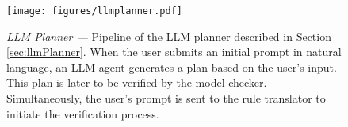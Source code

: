 


\begin{figure}[!h]
  \texttt{[image: figures/llmplanner.pdf]}
   \vspace{-12pt}
  \caption{\textit{\ours{} LLM Planner ---} 
  Pipeline of the LLM planner described in Section \ref{sec:llmPlanner}. When the user submits an initial prompt in natural language, an LLM agent generates a plan based on the user's input. This plan is later to be verified by the model checker. Simultaneously, the user's prompt is sent to the rule translator to initiate the verification process. 
}
  \label{fig:LLMplanner}
\end{figure}



